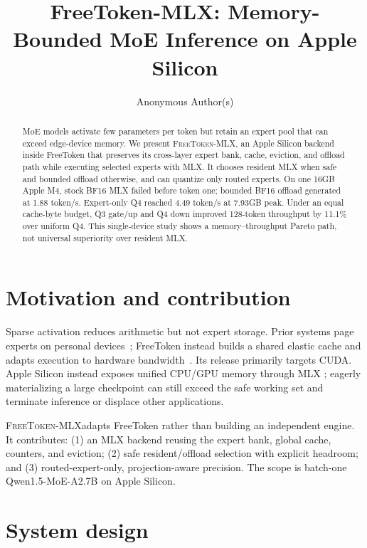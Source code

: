 \documentclass{article}
\title{FreeToken-MLX: Memory-Bounded MoE Inference on Apple Silicon}
\author{Anonymous Author(s)}
\newcommand{\system}{\textsc{FreeToken-MLX}}
\begin{document}
\maketitle

\begin{abstract}
MoE models activate few parameters per token but retain an expert pool that can
exceed edge-device memory. We present \system, an Apple Silicon backend inside
FreeToken that preserves its cross-layer expert bank, cache, eviction, and
offload path while executing selected experts with MLX. It chooses resident MLX
when safe and bounded offload otherwise, and can quantize only routed experts.
On one 16GB Apple M4, stock BF16 MLX failed before token one; bounded BF16
offload generated at 1.88 token/s. Expert-only Q4 reached 4.49 token/s at
7.93GB peak. Under an equal cache-byte budget, Q3 gate/up and Q4 down improved
128-token throughput by 11.1\% over uniform Q4. This single-device study shows
a memory--throughput Pareto path, not universal superiority over resident MLX.
\end{abstract}

\section{Motivation and contribution}

Sparse activation reduces arithmetic but not expert storage. Prior systems page
experts on personal devices~\citep{xue2024moeinfinity,eliseev2023offloading,yi2023edgemoe};
FreeToken instead builds a shared elastic cache and adapts execution to hardware
bandwidth~\citep{yang2026freetoken}. Its release primarily targets CUDA.
Apple Silicon instead exposes unified CPU/GPU memory through MLX
\citep{hannun2023mlx}; eagerly materializing a large checkpoint can still
exceed the safe working set and terminate inference or displace other
applications.

\system adapts FreeToken rather than building an independent engine. It
contributes: (1) an MLX backend reusing the expert bank, global cache, counters,
and eviction; (2) safe resident/offload selection with explicit headroom; and
(3) routed-expert-only, projection-aware precision. The scope is batch-one
Qwen1.5-MoE-A2.7B on Apple Silicon.

\section{System design}
\end{document}
